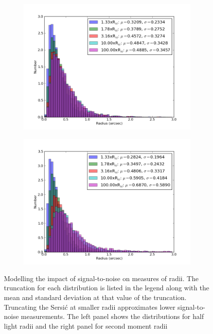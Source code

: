 \documentclass[]{article}
\begin{document}
\begin{figure}[ht]
\centering
\begin{subfigure}[b]{0.4\textwidth}
  \centering
 \includegraphics[width=\textwidth]{validation_figures/half_light_hist.png}
  \label{fig:hl_hist}
\end{subfigure}
\begin{subfigure}[b]{0.4\textwidth}
  \centering
  \includegraphics[width=\textwidth]{validation_figures/Second_moment_hist.png}
  \label{fig:mom_hist}
\end{subfigure}
\caption{Modelling the impact of signal-to-noise on measures of
  radii. The truncation for each distribution is listed in the legend
  along with the mean and standard deviation at that value of the
  truncation.  Truncating the Sersi{\'c} at smaller radii approximates
  lower signal-to-noise measurements.  The left panel shows the
  distributions for half light radii and the right panel for second
  moment radii}
\end{figure}
\end{document}
